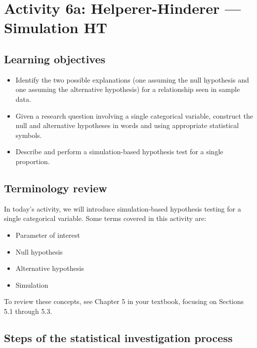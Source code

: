\documentclass[
]{report}
\begin{document}
\newpage

\hypertarget{activity-6a-helperer-hinderer-simulation-ht}{%
\section{Activity 6a: Helperer-Hinderer --- Simulation HT}\label{activity-6a-helperer-hinderer-simulation-ht}}


\hypertarget{learning-objectives-5}{%
\subsection{Learning objectives}\label{learning-objectives-5}}

\begin{itemize}
\item
  Identify the two possible explanations (one assuming the null hypothesis and one assuming the alternative hypothesis) for a relationship seen in sample data.
\item
  Given a research question involving a single categorical variable, construct the null and alternative hypotheses
  in words and using appropriate statistical symbols.
\item
  Describe and perform a simulation-based hypothesis test for a single proportion.
\end{itemize}

\hypertarget{terminology-review-8}{%
\subsection{Terminology review}\label{terminology-review-8}}

In today's activity, we will introduce simulation-based hypothesis testing for a single categorical variable. Some terms covered in this activity are:

\begin{itemize}
\item
  Parameter of interest
\item
  Null hypothesis
\item
  Alternative hypothesis
\item
  Simulation
\end{itemize}

To review these concepts, see Chapter 5 in your textbook, focusing on Sections 5.1 through 5.3.

\hypertarget{steps-of-the-statistical-investigation-process-1}{%
\subsection{Steps of the statistical investigation process}\label{steps-of-the-statistical-investigation-process-1}}
\end{document}

